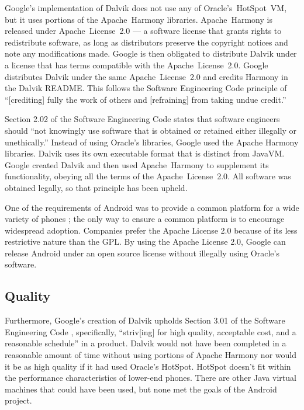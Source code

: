 \documentclass[11pt]{article}
\begin{document}
\begin{multicols}{2}
Google's implementation of Dalvik does not use any of Oracle's~HotSpot~VM, but
it uses portions of the Apache~Harmony libraries.  Apache~Harmony is released
under Apache~License~2.0 --- a software license that grants rights to
redistribute software, as long as distributors preserve the copyright notices
and note any modifications made.  \cite{apache-license} Google is then obligated
to distribute Dalvik under a license that has terms compatible with the
Apache~License~2.0.  Google distributes Dalvik under the same Apache~License~2.0
and credits Harmony in the Dalvik README.  \cite{dalvik-readme}  This follows
the Software Engineering Code principle of ``[crediting] fully the work of
others and [refraining] from taking undue credit.'' \cite[\S 7.03]{secode}

Section 2.02 of the Software Engineering Code states that software engineers
should ``not knowingly use software that is obtained or retained either
illegally or unethically.'' \cite[\S 2.02]{secode}  Instead of using Oracle's
libraries, Google used the Apache Harmony libraries.  Dalvik uses its own
executable format that is distinct from JavaVM.  Google created Dalvik and then
used Apache~Harmony to supplement its functionality, obeying all the terms of
the Apache~License~2.0.  All software was obtained legally, so that principle
has been upheld.

One of the requirements of Android was to provide a common platform for a wide
variety of phones \cite{open-handset-alliance-ann}; the only way to ensure a
common platform is to encourage widespread adoption.  Companies prefer the
Apache License 2.0 because of its less restrictive nature than the GPL.
\cite{why-apache2-license} By using the Apache License 2.0, Google can release
Android under an open source license without illegally using Oracle's software.


\subsection{Quality} %
\label{sub:analysis_quality}

Furthermore, Google's creation of Dalvik upholds Section 3.01 of the Software
Engineering Code \cite{secode}, specifically, ``striv[ing] for high quality,
acceptable cost, and a reasonable schedule'' in a product.  Dalvik would not
have been completed in a reasonable amount of time without using portions of
Apache Harmony nor would it be as high quality if it had used Oracle's HotSpot.
HotSpot doesn't fit within the performance characteristics of lower-end phones.
There are other Java virtual machines that could have been used, but none met
the goals of the Android project.


\end{multicols}
\end{document}

